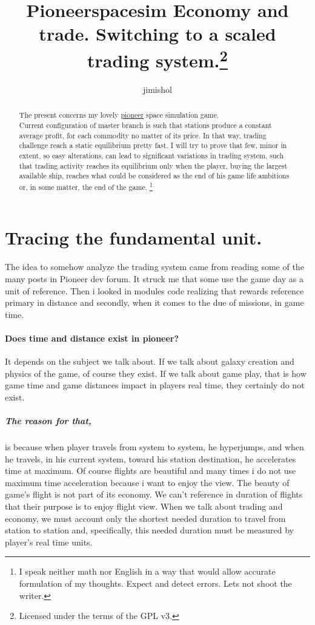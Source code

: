 \documentclass[]{article}
\title{Pioneerspacesim\linebreak
	Economy and trade.\linebreak
Switching to a scaled trading system.\footnote{Licensed under the terms of the GPL v3.}}
\author{jimishol}
\begin{document}
\maketitle

\begin{abstract}
	The present concerns my lovely \hyperref{https://pioneerspacesim.net/}{category}{name}{pioneer} space simulation game.\\
Current configuration of master branch is such that stations produce a constant average profit, for each commodity no matter of its price. In that way, trading challenge reach a static equilibrium pretty fast. I will try to prove that few, minor in extent, so easy alterations, can lead to significant variations in trading system, such that trading activity reaches its equilibrium only when the player, buying the largest available ship, reaches what could be considered as the end of his game life ambitions or, in some matter, the end of the game.
\footnote{I speak neither math nor English in a way that would allow  accurate formulation of my thoughts. Expect and detect errors. Lets not shoot the writer.}
\end{abstract}
\tableofcontents
\section{Tracing the fundamental unit.}
The idea to somehow analyze the trading system came from reading some of the many posts in Pioneer dev forum. It struck me that some use the game day as a unit of reference. Then i looked in modules code realizing that rewards reference primary in distance and secondly, when it comes to the due of missions, in game time.
\paragraph{Does time and distance exist in pioneer?} It depends on the subject we talk about. If we talk about galaxy creation and physics of the game, of course they exist. If we talk about game play, that is how game time and game distances impact in players real time, they certainly do not exist.
\subparagraph*{The reason for that,} is because when player travels from system to system, he hyperjumps, and when he travels, in his current system, toward his station destination, he accelerates time at maximum. Of course flights are beautiful and many times i do not use maximum time acceleration because i want to enjoy the view. The beauty of game's flight is not part of its economy. We can't reference in duration of flights that their purpose is to enjoy flight view. 
When we talk about trading and economy, we must account only the shortest needed duration to travel from station to station and, specifically, this needed duration must be measured by  player's real time units.
\end{document}
